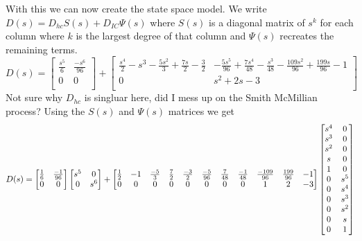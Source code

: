 \documentclass{article}
\begin{document}
With this we can now create the state space model.
We write $D(s) = D_{hc}S(s) + D_{IC}\Psi(s)$ where $S(s)$ is a diagonal matrix of $s^k$ for each column where $k$ is the largest degree of that column and $\Psi(s)$ recreates the remaining terms.
$$
D(s) =
\begin{bmatrix}
\frac{s^5}{6} & \frac{-s^6}{96} \\
  0 &   0 \\
\end{bmatrix}
+
\begin{bmatrix}
\frac{s^4}{2}-s^3-\frac{5 s^2}{3}+\frac{7 s}{2}-\frac{3}{2} & -\frac{5 s^5}{96}+\frac{7 s^4}{48}-\frac{s^3}{48}-\frac{109s^2}{96}+\frac{199 s}{96}-1 \\
0 & s^2+2 s-3 \\
\end{bmatrix}
$$
Not sure why $D_{hc}$ is singluar here, did I mess up on the Smith McMillian process?
\newline
Using the $S(s)$ and $\Psi(s)$ matrices we get
$$
D(s) =
\begin{bmatrix}
\frac{1}{6} & \frac{-1}{96} \\
0 & 0 \\
\end{bmatrix}
\begin{bmatrix}
s^5 & 0 \\
0 & s^6 \\
\end{bmatrix}
+
\setcounter{MaxMatrixCols}{11}
\begin{bmatrix}
\frac{1}{2} & -1 & \frac{-5}{3} & \frac{7}{2} & \frac{-3}{2} & \frac{-5}{96} & \frac{7}{48} & \frac{-1}{48} & \frac{-109}{96} & \frac{199}{96} & -1 \\
          0 &  0 &            0 &           0 &            0 &             0 &            0 &             0 &               1 &              2 & -3 \\
\end{bmatrix}
\begin{bmatrix}
s^4 & 0 \\
s^3 & 0 \\
s^2 & 0 \\
  s & 0 \\
  1 & 0 \\
  0 & s^5 \\
  0 & s^4 \\
  0 & s^3 \\
  0 & s^2 \\
  0 & s \\
  0 & 1 \\
\end{bmatrix}
$$
\end{document}
